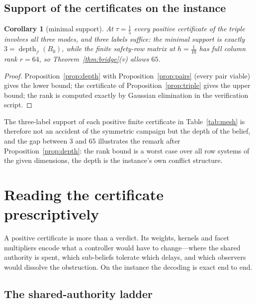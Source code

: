 \documentclass[11pt,a4paper]{article}
\theoremstyle{plain}
\newtheorem{corollary}[theorem]{Corollary}
\theoremstyle{definition}
\theoremstyle{remark}
\newcommand{\calI}{\mathcal{I}}
\newcommand{\tfr}[2]{\tfrac{#1}{#2}}
\DeclareMathOperator{\depth}{depth}
\begin{document}
\subsection{Support of the certificates on the instance}

\begin{corollary}[minimal support]\label{cor:support}
At $\tau=\tfr15$ every positive certificate of the triple involves all three modes, and three labels suffice: the minimal support is exactly $3=\depth_\calI(B_0)$, while the finite safety-row matrix at $h=\tfr1{10}$ has full column rank $r=64$, so Theorem~\ref{thm:bridge}(v) allows $65$.
\end{corollary}

\begin{proof}
Proposition~\ref{prop:depth} with Proposition~\ref{prop:pairs} (every pair viable) gives the lower bound; the certificate of Proposition~\ref{prop:triple} gives the upper bound; the rank is computed exactly by Gaussian elimination in the verification script.
\end{proof}

The three-label support of each positive finite certificate in Table~\ref{tab:mesh} is therefore not an accident of the symmetric campaign but the depth of the belief, and the gap between $3$ and $65$ illustrates the remark after Proposition~\ref{prop:depth}: the rank bound is a worst case over all row systems of the given dimensions, the depth is the instance's own conflict structure.
\section{Reading the certificate prescriptively}\label{sec:ladder}

A positive certificate is more than a verdict. Its weights, kernels and facet multipliers encode what a controller would have to change---where the shared authority is spent, which sub-beliefs tolerate which delays, and which observers would dissolve the obstruction. On the instance the decoding is exact end to end.

\subsection{The shared-authority ladder}
\end{document}
